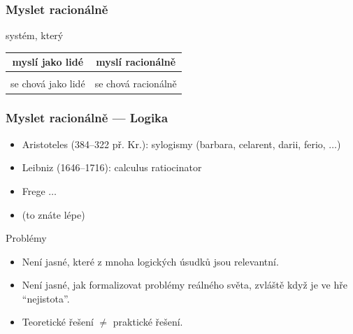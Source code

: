 \documentclass[red,handout,professionalfont]{beamer}
\theoremstyle{definition}
\newcommand{\0}{\mbox{${\bf 0}$}}
\begin{document}
\begin{frame}\frametitle{Myslet racionálně}
\large
\begin{center}
systém, který\\[1cm]
\begin{tabular}{c|c}
 myslí jako lidé & \alert{myslí racionálně} \\[0.5cm]
 \hline
\\
 se chová jako lidé & se chová racionálně \\
\end{tabular}
\end{center}
\end{frame}


\begin{frame}\frametitle{Myslet racionálně --- Logika}
\begin{itemize}
 \item Aristoteles (384--322 př. Kr.): sylogismy (barbara, celarent, darii, ferio, $\dots$)\pause{}


 \item Leibniz (1646--1716):  calculus ratiocinator\pause{}
 \item Frege $\ldots$\pause{}
 \item (to znáte lépe)\pause{}
\end{itemize}
\begin{block}{}
\begin{center}
Problémy\pause{}
\end{center}
\end{block}
\begin{itemize}
 \item Není jasné, které z mnoha logických úsudků jsou relevantní.\pause{}
% 
 \item Není jasné, jak formalizovat problémy reálného světa, zvláště když je ve hře ``nejistota''.\pause{}
 \item Teoretické řešení $\neq$ praktické řešení.
\end{itemize}


\end{frame}
\end{document}
